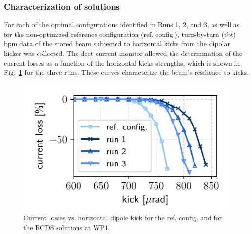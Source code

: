 \subsubsection{Characterization of solutions}
For each of the optimal configurations identified in Runs 1, 2, and 3, as well as for the non-optimized reference configuration (ref. config.), turn-by-turn (\gls*{tbt}) \gls*{bpm} data of the stored beam subjected to horizontal kicks from the dipolar kicker was collected. The \gls*{dcct} current monitor allowed the determination of the current losses as a function of the horizontal kicks strengths, which is shown in Fig.~\ref{fig:loss_kicks} for the three runs. These curves characterize the beam's resilience to kicks.
\begin{figure}[tb]
    \centering
    \includegraphics[width=0.6\columnwidth]{Images/WEPL087_f1.pdf}
    \caption[Current losses vs. horizontal dipole kick for the ref. config. and for the RCDS solutions at WP1.]{Current losses vs. horizontal dipole kick for the ref. config. and for the \gls*{RCDS} solutions at \gls*{WP1}.}
       \label{fig:loss_kicks}
\end{figure}

